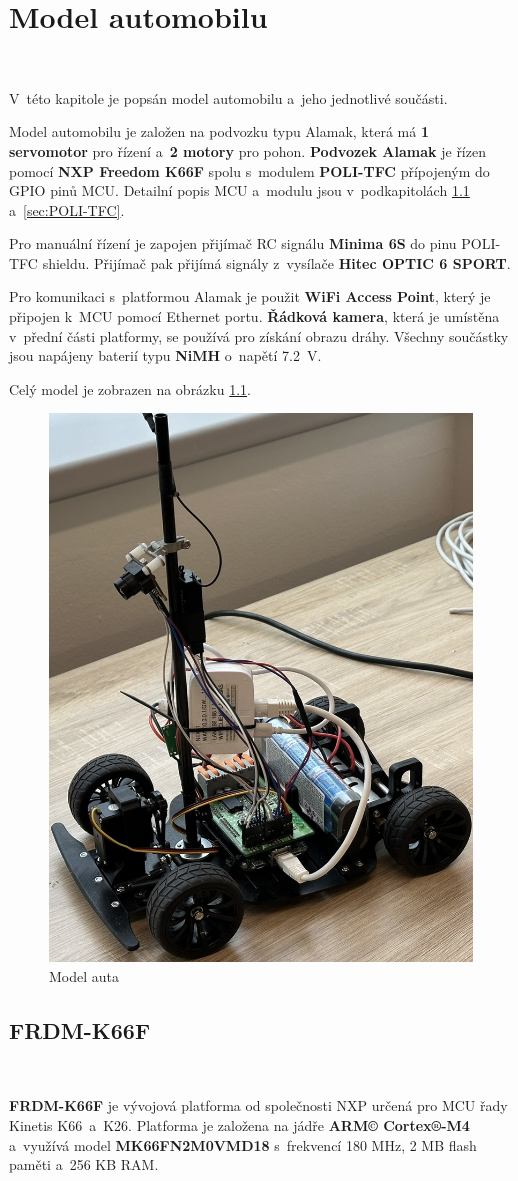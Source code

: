 \chapter{Model automobilu}
\label{sec:CarModel}
\

V~této kapitole je popsán model automobilu a~jeho jednotlivé součásti.

Model automobilu je založen na podvozku typu Alamak, která má \textbf{1 servomotor}
pro řízení a~\textbf{2 motory} pro pohon.
\textbf{Podvozek Alamak} je řízen pomocí \textbf{NXP Freedom K66F} \cite{frdmk66UserGuide} spolu s~modulem \textbf{POLI-TFC} přípojeným do GPIO pinů
MCU. Detailní popis MCU a~modulu jsou v~podkapitolách \ref{sec:FRDM-K66F}
a~\ref{sec:POLI-TFC}.

Pro manuální řízení je zapojen přijímač RC signálu \textbf{Minima 6S} do pinu
POLI-TFC shieldu. Přijímač pak přijímá signály z~vysílače \textbf{Hitec OPTIC 6 SPORT}.

Pro komunikaci s~platformou Alamak je použit \textbf{WiFi Access Point}, který je
připojen k~MCU pomocí Ethernet portu. \textbf{Řádková kamera}, která je umístěna
v~přední části platformy, se používá pro získání obrazu dráhy. Všechny součástky
jsou napájeny baterií typu \textbf{NiMH} o~napětí 7.2~V.

Celý model je zobrazen na obrázku \ref{fig:car}.
\begin{figure}[!h]
    \centering
    \includegraphics[width = .4\linewidth]{Figures/Car.jpeg}
    \caption{Model auta}
    \label{fig:car}
\end{figure}

\section{FRDM-K66F}
\label{sec:FRDM-K66F}\

\textbf{FRDM-K66F} je vývojová platforma od společnosti NXP určená pro MCU řady Kinetis
K66~a~K26. Platforma je založena na jádře \textbf{ARM© Cortex®-M4} a~využívá model
\textbf{MK66FN2M0VMD18} s~frekvencí 180 MHz, 2 MB flash paměti a~256 KB RAM.

